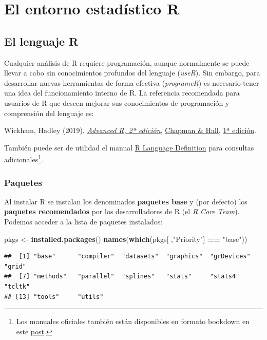 \documentclass[
]{book}
\newenvironment{Shaded}{\begin{snugshade}}{\end{snugshade}}
\newcommand{\FunctionTok}[1]{\textcolor[rgb]{0.13,0.29,0.53}{\textbf{#1}}}
\newcommand{\NormalTok}[1]{#1}
\newcommand{\OtherTok}[1]{\textcolor[rgb]{0.56,0.35,0.01}{#1}}
\newcommand{\SpecialCharTok}[1]{\textcolor[rgb]{0.81,0.36,0.00}{\textbf{#1}}}
\newcommand{\StringTok}[1]{\textcolor[rgb]{0.31,0.60,0.02}{#1}}
\theoremstyle{break}
\theoremstyle{nonumberplain}
\let\oldfootnote\footnote
\renewcommand\footnote[1]{\oldfootnote{\hspace{2mm}#1}}
\begin{document}
\part{El entorno estadístico R}\label{part-el-entorno-estaduxedstico-r}

\chapter{El lenguaje R}\label{r}

Cualquier análisis de R requiere programación, aunque normalmente se puede llevar a cabo sin conocimientos profundos del lenguaje (\emph{useR}).
Sin embargo, para desarrollar nuevas herramientas de forma efectiva (\emph{programeR}) es necesario tener una idea del funcionamiento interno de R.
La referencia recomendada para usuarios de R que deseen mejorar sus conocimientos de programación y comprensión del lenguaje es:

Wickham, Hadley (2019). \emph{\href{https://adv-r.hadley.nz/}{Advanced R, 2ª edición}}, \href{https://www.amazon.com/dp/0815384572}{Chapman \& Hall}, \href{http://adv-r.had.co.nz/}{1ª edición}.

También puede ser de utilidad el manual \href{https://cran.r-project.org/doc/manuals/R-lang.html}{R Language Definition}
para consultas adicionales\footnote{Los manuales oficiales también están disponibles en formato bookdown en este \href{https://colinfay.me/r-manuals}{post}.}.

\section{Paquetes}\label{paquetes}

Al instalar R se instalan los denominados \textbf{paquetes base} y (por defecto) los \textbf{paquetes recomendados} por los desarrolladores de R (el \emph{R Core Team}).
Podemos acceder a la lista de paquetes instalados:

\begin{Shaded}
\begin{Highlighting}[]
\NormalTok{pkgs }\OtherTok{\textless{}{-}} \FunctionTok{installed.packages}\NormalTok{()}
\FunctionTok{names}\NormalTok{(}\FunctionTok{which}\NormalTok{(pkgs[ ,}\StringTok{"Priority"}\NormalTok{] }\SpecialCharTok{==} \StringTok{"base"}\NormalTok{))}
\end{Highlighting}
\end{Shaded}

\begin{verbatim}
##  [1] "base"      "compiler"  "datasets"  "graphics"  "grDevices" "grid"     
##  [7] "methods"   "parallel"  "splines"   "stats"     "stats4"    "tcltk"    
## [13] "tools"     "utils"
\end{verbatim}
\end{document}
